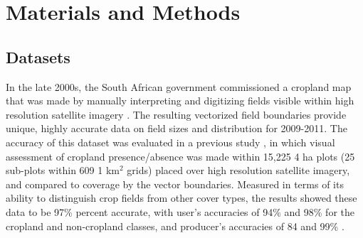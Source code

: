 \documentclass[a4paper]{article}
\begin{document}




\vspace{-0.5 cm}
\section*{Materials and Methods}
\vspace{-0.3 cm}
\subsection*{Datasets}
\vspace{-0.2 cm}
In the late 2000s, the South African government commissioned a cropland map that was made by manually interpreting and digitizing fields visible within high resolution satellite imagery \citep{fourie_better_2009}. The resulting vectorized field boundaries provide unique, highly accurate data on field sizes and distribution for 2009-2011. The accuracy of this dataset was evaluated in a previous study \citep{estes_platform_2016}, in which visual assessment of cropland presence/absence was made within 15,225 4 ha plots (25 sub-plots within 609 1 km$^2$ grids) placed over high resolution satellite imagery, and compared to coverage by the vector boundaries. Measured in terms of its ability to distinguish crop fields from other cover types, the results showed these data to be 97\% percent accurate, with user's accuracies of 94\% and 98\% for the cropland and non-cropland classes, and producer's accuracies of 84 and 99\% \citep[see SI for more description, and][]{estes_platform_2016}. 
\end{document}
